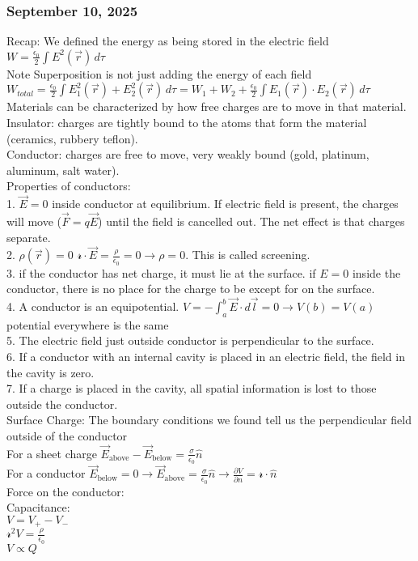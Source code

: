 \documentclass{article}
\begin{document}
\subsubsection*{September 10, 2025}
Recap: We defined the energy as being stored in the electric field $W=\frac{\epsilon_0}{2} \int E^2(\vec{r}) \, d\tau$ \\
Note Superposition is not just adding the energy of each field $W_{total}=\frac{\epsilon_0}{2} \int E_1^2(\vec{r})+E_2^2(\vec{r}) \, d\tau=W_1+W_2+\frac{\epsilon_0}{2}\int E_1(\vec{r})\cdot E_2(\vec{r}) \, d\tau$ \\
Materials can be characterized by how free charges are to move in that material. \\
Insulator: charges are tightly bound to the atoms that form the material (ceramics, rubbery teflon). \\
Conductor: charges are free to move, very weakly bound (gold, platinum, aluminum, salt water). \\
Properties of conductors: \\
1. $\vec{E}=0$ inside conductor at equilibrium. If electric field is present, the charges will move ($\vec{F}=q\vec{E}$) until the field is cancelled out. The net effect is that charges separate. \\
2. $\rho(\vec{r})=0$ $\mathcal{r}\cdot\vec{E}=\frac{\rho}{\epsilon_0}=0 \rightarrow \rho=0$. This is called screening. \\
3. if the conductor has net charge, it must lie at the surface. if $E=0$ inside the conductor, there is no place for the charge to be except for on the surface. \\
4. A conductor is an equipotential. $V=-\int_a^b \vec{E} \cdot d\vec{l}=0 \rightarrow V(b)=V(a)$ potential everywhere is the same \\
5. The electric field just outside conductor is perpendicular to the surface. \\
6. If a conductor with an internal cavity is placed in an electric field, the field in the cavity is zero. \\
7. If a charge is placed in the cavity, all spatial information is lost to those outside the conductor. \\
Surface Charge:
The boundary conditions we found tell us the perpendicular field outside of the conductor \\
For a sheet charge $\vec{E}_{\text{above}}-\vec{E}_{\text{below}}=\frac{\sigma}{\epsilon_0}\hat{n}$ \\
For a conductor $\vec{E}_{\text{below}}=0\rightarrow \vec{E}_{\text{above}}=\frac{\sigma}{\epsilon_0}\hat{n} \rightarrow \frac{\partial V}{\partial n}=\mathcal{r}\cdot\hat{n}$ \\
Force on the conductor: \\
Capacitance: \\
$V=V_+-V_-$ \\
$\mathcal{r}^2V=\frac{\rho}{\epsilon_0}$ \\
$V \propto Q$ \\
\end{document}
